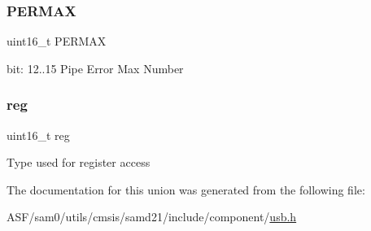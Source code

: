 \subsubsection{\texorpdfstring{PERMAX}{PERMAX}}
{\footnotesize\ttfamily uint16\+\_\+t P\+E\+R\+M\+AX}

bit\+: 12..15 Pipe Error Max Number \mbox{\label{union_u_s_b___h_o_s_t___c_t_r_l___p_i_p_e___type_a11760f5020019f4aa8cb02e694f7cc44}} 
\subsubsection{\texorpdfstring{reg}{reg}}
{\footnotesize\ttfamily uint16\+\_\+t reg}

Type used for register access 

The documentation for this union was generated from the following file\+:\begin{DoxyCompactItemize}
\item 
A\+S\+F/sam0/utils/cmsis/samd21/include/component/\mbox{\hyperlink{component_2usb_8h}{usb.\+h}}\end{DoxyCompactItemize}
